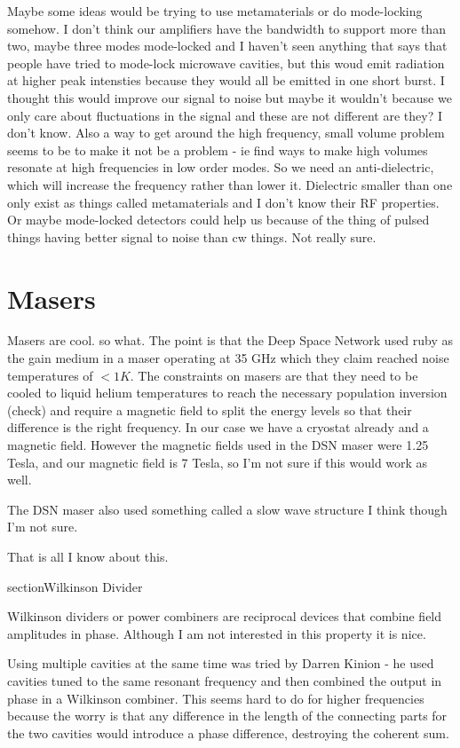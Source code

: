 \documentclass[11pt]{article}
\begin{document}
Maybe some ideas would be trying to use metamaterials or do mode-locking somehow. I don't think our amplifiers have the bandwidth to support more than two, maybe three modes mode-locked and I haven't seen anything that says that people have tried to mode-lock microwave cavities, but this woud emit radiation at higher peak intensties because they would all be emitted in one short burst. I thought this would improve our 
signal to noise but maybe it wouldn't because we only care about fluctuations in the signal and these are not different are they? I don't know.
Also a way to get around the high frequency, small volume problem seems to be to make it not be a problem - ie find ways to make high volumes resonate at high frequencies in low order modes. So we need an anti-dielectric, which will increase the frequency rather than lower it. Dielectric smaller than one only exist as things called metamaterials and I don't know their RF properties.
Or maybe mode-locked detectors could help us because of the thing of pulsed things having better signal to noise than cw things. Not really sure.

\section{Masers}

Masers are cool. so what. The point is that the Deep Space Network used ruby as the gain medium in a maser operating at 35 GHz which they claim reached noise temperatures of $<1 K$. The constraints on masers are that they need to be cooled to liquid helium temperatures to reach the necessary population inversion (check) and require a magnetic field to split the energy levels so that their difference is the right frequency. In our case we have a cryostat already and a magnetic field. However the magnetic fields used in the DSN maser were 1.25 Tesla, and our magnetic field is 7 Tesla, so I'm not sure if this would work as well.

The DSN maser also used something called a slow wave structure I think though I'm not sure.

That is all I know about this.

section{Wilkinson Divider}

Wilkinson dividers or  power combiners are reciprocal devices that combine field amplitudes in phase. Although I am not interested in this property it is nice.

Using multiple cavities at the same time was tried by Darren Kinion - he used cavities tuned to the same resonant frequency and then combined the output in phase in a Wilkinson combiner. This seems hard to do for higher frequencies because the worry is that any difference in the length of the connecting parts for the two cavities would introduce a phase difference, destroying the coherent sum. 
\end{document}
